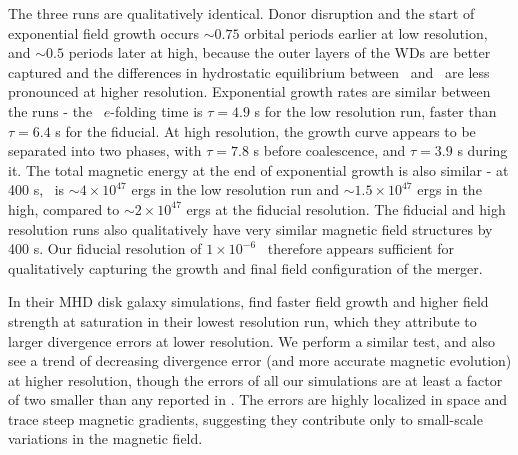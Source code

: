 The three runs are qualitatively identical.  Donor disruption and the start of exponential field growth occurs $\sim0.75$ orbital periods earlier at low resolution, and $\sim0.5$ periods later at high, because the outer layers of the WDs are better captured and the differences in hydrostatic equilibrium between \arepo\ and \gasoline\ are less pronounced at higher resolution.  Exponential growth rates are similar between the runs - the \EB\ $e$-folding time is $\tau = 4.9$ s for the low resolution run, faster than $\tau = 6.4$ s for the fiducial.  At high resolution, the growth curve appears to be separated into two phases, with $\tau = 7.8$ s before coalescence, and $\tau = 3.9$ s during it.  The total magnetic energy at the end of exponential growth is also similar - at 400 s, \EB\ is $\sim4\times10^{47}$ ergs in the low resolution run and $\sim1.5\times10^{47}$ ergs in the high, compared to $\sim2\times10^{47}$ ergs at the fiducial resolution.  The fiducial and high resolution runs also qualitatively have very similar magnetic field structures by 400 s.  Our fiducial resolution of $1\times10^{-6}$ \Msun\ therefore appears sufficient for qualitatively capturing the growth and final field configuration of the merger.

In their MHD disk galaxy simulations, \cite{pakmv13} find faster field growth and higher field strength at saturation in their lowest resolution run, which they attribute to larger divergence errors at lower resolution.  We perform a similar test, and also see a trend of decreasing divergence error (and more accurate magnetic evolution) at higher resolution, though the errors of all our simulations are at least a factor of two smaller than any reported in \cite{pakmv13}.  The errors are highly localized in space and trace steep magnetic gradients, suggesting they contribute only to small-scale variations in the magnetic field.



